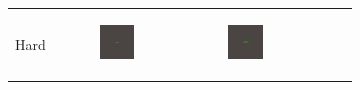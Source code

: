 \documentclass[conference]{IEEEtran}
\newlength{\subfigwidth}
\begin{document}
\begin{figure}
\begin{subfigure}[b]{\textwidth}
        \begin{tabular}{r M{\subfigwidth} M{\subfigwidth} M{\subfigwidth} M{\subfigwidth} M{\subfigwidth} }
            Hard                                                                                    &
            \begin{subfigure}[b]{\subfigwidth}
                \includegraphics[width=\textwidth]{figures/growth_comparison_lambda_1e-2/hard.0020.png}
            \end{subfigure} &
            \begin{subfigure}[b]{\subfigwidth}
                \includegraphics[width=\textwidth]{figures/growth_comparison_lambda_1e-2/hard.0040.png}

\end{subfigure}
\end{tabular}
\end{subfigure}
\end{figure}
\end{document}
